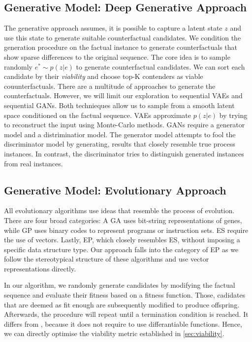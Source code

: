 \documentclass[./../../paper.tex]{subfiles}
\begin{document}
\subsection{Generative Model: Deep Generative Approach}
The generative approach assumes, it is possible to capture a latent state $z$ and use this state to generate suitable counterfactual candidates. We condition the generation procedure on the factual instance to generate counterfactuals that show sparse differences to the original sequence. The core idea is to sample randomly $e^* \sim p(z|e)$ to generate counterfactual candidates. We can sort each candidate by their \emph{viability} and choose top-K contenders as viable couunterfactuals. There are a multitude of approaches to generate the counterfactuals. However, we will limit our exploration to sequential \glspl{VAE} and sequential \glspl{GAN}. Both technieques allow us to sample from a smooth latent space conditioned on the factual sequence. \glspl{VAE} approximate $p(z|e)$ by trying to reconstruct the input using Monte-Carlo methods. \glspl{GAN} require a generator model and a distriminatior model. The generator model attempts to fool the discriminator model by generating, results that closely resemble true process instances. In contrast, the discriminator tries to distinguish generated instances from real instances. 


\subsection{Generative Model: Evolutionary Approach}
All evolutionary algorithms use ideas that resemble the process of evolution. There are four broad categories: A \gls{GA} uses bit-string representations of genes, while \gls{GP} uses binary codes to represent programs or instruction sets. \gls{ES} require the use of vectors. Lastly, \gls{EP}, which closely resembles \gls{ES}, without imposing a specific data structure type. Our approach falls into the category of \gls{EP} as we follow the stereotypical structure of these algorithms and use vector representations directly.

In our algorithm, we randomly generate candidates by modifying the factual sequence and evaluate their fitness based on a fitness function. Those, cadidates that are deemed as fit enough are subsequently modified to produce offspring. Afterwards, the procedure will repeat until a termination condition is reached. It differs from , because it does not require to use differantiable functions. Hence, we can directly optimise the viability metric established in \autoref{sec:viability}. 
\end{document}
